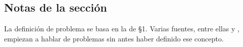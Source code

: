 \subsection*{Notas de la sección}

La definición de problema se basa en la de \cite{skiena} \S 1. Varias fuentes, entre ellas \cite{cardoso} y \cite{levitin}, empiezan a hablar de problemas sin antes haber definido ese concepto.

